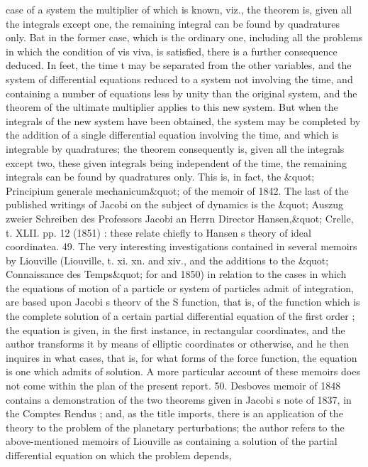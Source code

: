 \documentclass[11pt,a4paper]{book}
\begin{document}
case
of a
system
the
multiplier
of which
is
known,
viz., the theorem
is, given
all the
integrals
except
one,
the
remaining
integral
can
be
found
by
quadratures
only.
Bat
in
the
former
case,
which
is
the
ordinary one, including
all
the problems in which the
condition
of
vis
viva,
is
satisfied,
there
is
a further
consequence
deduced.
In
feet, the
time
t
may
be
separated
from
the
other
variables,
and
the
system
of
differential
equations
reduced
to
a
system
not
involving
the
time,
and
containing
a
number
of
equations
less
by
unity
than
the
original
system,
and
the
theorem
of
the
ultimate
multiplier
applies
to
this
new
system.
But when
the
integrals
of
the
new
system
have
been
obtained,
the
system
may
be
completed
by
the
addition
of
a
single
differential
equation
involving
the
time,
and
which
is
integrable by
quadratures;
the
theorem
consequently
is, given
all
the
integrals except
two,
these
given
integrals being
independent
of
the
time,
the
remaining
integrals
can
be
found
by
quadratures
only.
This
is,
in
fact, the
\&quot;
Principium generale
mechanicum\&quot; of the memoir of 1842.
The
last
of
the
published
writings
of
Jacobi
on
the subject
of
dynamics
is
the
\&quot; Auszug
zweier
Schreiben
des
Professors
Jacobi
an
Herrn
Director
Hansen,\&quot;
Crelle,
t. XLII. pp. 12
(1851)
:
these
relate chiefly to Hansen s theory of ideal coordinatea.
49.
The very
interesting
investigations
contained
in
several
memoirs by Liouville
(Liouville,
t.
xi. xn. and
xiv.,
and
the
additions to the
\&quot; Connaissance
des
Temps\&quot;
for
and
1850)
in
relation
to
the
cases
in
which
the
equations
of
motion
of
a
particle
or
system
of
particles
admit
of
integration,
are
based
upon
Jacobi s theorv
of
the S
function,
that
is,
of
the
function
which
is
the
complete
solution
of
a
certain
partial
differential
equation
of
the
first
order
;
the
equation
is
given,
in
the
first
instance,
in
rectangular
coordinates, and
the
author
transforms
it by means
of
elliptic
coordinates
or
otherwise, and
he
then
inquires
in
what
cases,
that
is,
for
what
forms
of
the
force
function,
the
equation
is one which
admits
of
solution.
A more particular
account
of these memoirs does not come within the plan of the present
report.
50.
Desboves
memoir of 1848 contains a demonstration
of the two theorems given
in
Jacobi s
note
of
1837,
in
the
Comptes
Rendus ;
and,
as
the
title
imports,
there
is
an application of the theory
to
the problem
of the
planetary perturbations;
the author
refers
to
the
above-mentioned
memoirs
of
Liouville
as
containing
a
solution
of
the
partial
differential
equation
on
which
the
problem
depends,
\end{document}
